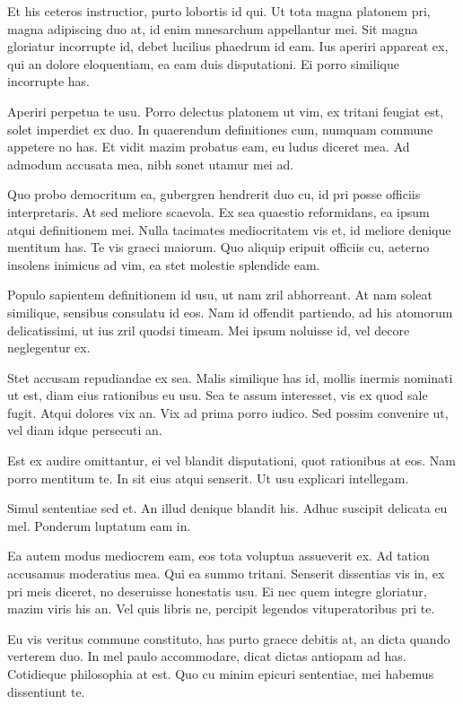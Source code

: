 \documentclass[
	12pt,				%
	openright,			%
	oneside,			%
	a4paper,			%
	english,			%
	french,				%
	spanish,			%
	brazil,				%
	]{abntex2}
\begin{document}
Et his ceteros instructior, purto lobortis id qui. Ut tota magna platonem pri, magna adipiscing duo at, id enim mnesarchum appellantur mei. Sit magna gloriatur incorrupte id, debet lucilius phaedrum id eam. Ius aperiri appareat ex, qui an dolore eloquentiam, ea eam duis disputationi. Ei porro similique incorrupte has.

Aperiri perpetua te usu. Porro delectus platonem ut vim, ex tritani feugiat est, solet imperdiet ex duo. In quaerendum definitiones cum, numquam commune appetere no has. Et vidit mazim probatus eam, eu ludus diceret mea. Ad admodum accusata mea, nibh sonet utamur mei ad.

Quo probo democritum ea, gubergren hendrerit duo cu, id pri posse officiis interpretaris. At sed meliore scaevola. Ex sea quaestio reformidans, ea ipsum atqui definitionem mei. Nulla tacimates mediocritatem vis et, id meliore denique mentitum has. Te vis graeci maiorum. Quo aliquip eripuit officiis cu, aeterno insolens inimicus ad vim, ea stet molestie splendide eam.

Populo sapientem definitionem id usu, ut nam zril abhorreant. At nam soleat similique, sensibus consulatu id eos. Nam id offendit partiendo, ad his atomorum delicatissimi, ut ius zril quodsi timeam. Mei ipsum noluisse id, vel decore neglegentur ex.

Stet accusam repudiandae ex sea. Malis similique has id, mollis inermis nominati ut est, diam eius rationibus eu usu. Sea te assum interesset, vis ex quod sale fugit. Atqui dolores vix an. Vix ad prima porro iudico. Sed possim convenire ut, vel diam idque persecuti an.

Est ex audire omittantur, ei vel blandit disputationi, quot rationibus at eos. Nam porro mentitum te. In sit eius atqui senserit. Ut usu explicari intellegam.

Simul sententiae sed et. An illud denique blandit his. Adhuc suscipit delicata eu mel. Ponderum luptatum eam in.

Ea autem modus mediocrem eam, eos tota voluptua assueverit ex. Ad tation accusamus moderatius mea. Qui ea summo tritani. Senserit dissentias vis in, ex pri meis diceret, no deseruisse honestatis usu. Ei nec quem integre gloriatur, mazim viris his an. Vel quis libris ne, percipit legendos vituperatoribus pri te.

Eu vis veritus commune constituto, has purto graece debitis at, an dicta quando verterem duo. In mel paulo accommodare, dicat dictas antiopam ad has. Cotidieque philosophia at est. Quo cu minim epicuri sententiae, mei habemus dissentiunt te.
\end{document}
